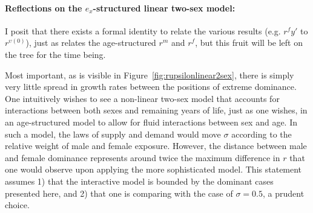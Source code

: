 \paragraph{Reflections on the $e_x$-structured linear two-sex model:}
I posit that there exists a formal identity to relate the various results
(e.g. $r^f{y'}$ to $r^{\upsilon (0)}$), just as \citet[pp. 56]{coale1972growth} relates 
the age-structured $r^m$ and $r^f$, but this fruit will be left on the tree
for the time being.

Most important, as is visible in Figure~\ref{fig:rupsilonlinear2sex}, there is
simply very little spread in growth rates between the positions of extreme
dominance. One intuitively wishes to see a non-linear two-sex model that
accounts for interactions between both sexes and remaining years of life, just
as one wishes, in an age-structured model to allow for fluid interactions
between sex and age. In such a model, the laws of supply and demand would move
$\sigma$ according to the relative weight of male and female exposure. However,
the distance between male and female dominance represents around twice the
maximum difference in $r$ that one would observe upon applying the more
sophisticated model. This statement assumes 1) that the interactive model is
bounded by the dominant cases presented here, and 2) that one is comparing with
the case of $\sigma = 0.5$, a prudent choice. 


